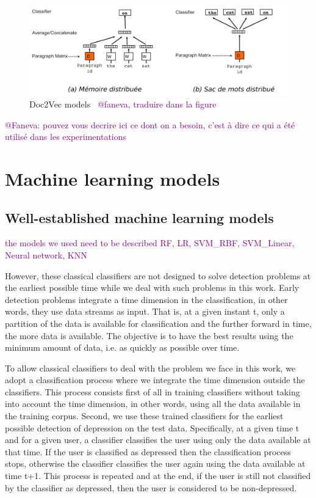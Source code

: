 \documentclass[graybox]{svmult}
\newcommand{\jm}[1]{\textcolor{purple}{{  #1}}}
\begin{document}
\begin{figure}[!ht]
	\includegraphics[scale=0.4]{images/architecture_doc2vec.png}
	\caption{Doc2Vec models~\cite{LeM14} \jm{@faneva, traduire dans la figure}}
	\label{fig:architecture_d2v}
\end{figure}

\jm{@Faneva: pouvez vous decrire ici ce dont on a besoin, c'est à dire ce qui a été utilisé dans les experimentations}

\section{Machine learning models}
\subsection{Well-established machine learning models}

\jm{the models we used need to be described RF, LR, SVM\_RBF, SVM\_Linear, Neural network, KNN}


However, these classical classifiers are not designed to solve detection problems at the earliest possible time while we deal with such problems in this work. Early detection problems integrate a time dimension in the classification, in other words, they use data streams as input. That is, at a given instant t, only a partition of the data is available for classification and the further forward in time, the more data is available. The objective is to have the best results using the minimum amount of data, i.e. as quickly as possible over time. 

To allow classical classifiers to deal with the problem we face in this work, we adopt a classification process where we integrate the time dimension outside the classifiers. This process consists first of all in training classifiers without taking into account the time dimension, in other words, using all the data available in the training corpus. Second, we use these trained classifiers for the earliest possible detection of depression on the test data. Specifically, at a given time t and for a given user, a classifier classifies the user using only the data available at that time. If the user is classified as depressed then the classification process stops, otherwise the classifier classifies the user again using the data available at time t+1. This process is repeated and at the end, if the user is still not classified by the classifier as depressed, then the user is considered to be non-depressed.
\end{document}
